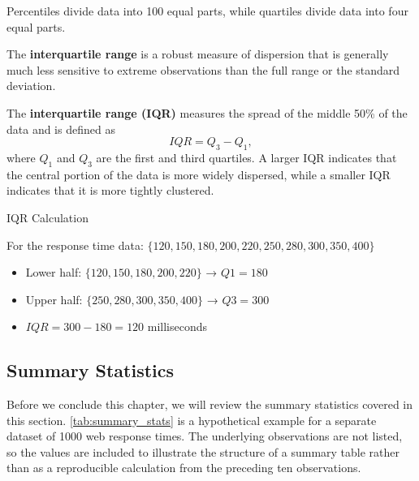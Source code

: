 Percentiles divide data into 100 equal parts, while quartiles divide data into four equal parts.

The \textbf{interquartile range} is a robust measure of dispersion that is generally much less sensitive to extreme observations than the full range or the standard deviation.

\begin{definition}
    The \textbf{interquartile range (IQR)} measures the spread of the middle 50\% of the data and is defined as
    $$
    IQR = Q_3 - Q_1,
    $$
    where $Q_1$ and $Q_3$ are the first and third quartiles. A larger IQR indicates that the central portion of the data is more widely dispersed, while a smaller IQR indicates that it is more tightly clustered.
\end{definition}
    

\begin{example} IQR Calculation

For the response time data: $\{120, 150, 180, 200, 220, 250, 280, 300, 350, 400\}$

\begin{itemize}
    \item Lower half: $\{120, 150, 180, 200, 220\}$ → $Q1 = 180$
    \item Upper half: $\{250, 280, 300, 350, 400\}$ → $Q3 = 300$
    \item $IQR = 300 - 180 = 120$ milliseconds
\end{itemize}
\end{example}


\subsection*{Summary Statistics}

Before we conclude this chapter, we will review the summary statistics covered in this section. \autoref{tab:summary_stats} is a hypothetical example for a separate dataset of 1000 web response times. The underlying observations are not listed, so the values are included to illustrate the structure of a summary table rather than as a reproducible calculation from the preceding ten observations.

